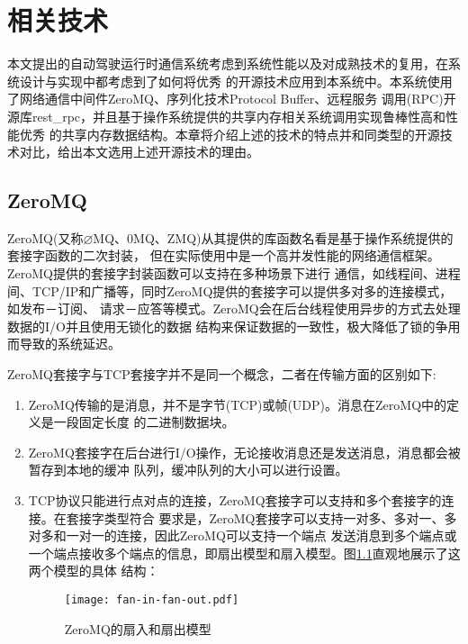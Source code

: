 \chapter{相关技术}
本文提出的自动驾驶运行时通信系统考虑到系统性能以及对成熟技术的复用，在系统设计与实现中都考虑到了如何将优秀
的开源技术应用到本系统中。本系统使用了网络通信中间件ZeroMQ、序列化技术Protocol Buffer、远程服务
调用(RPC)开源库rest\_rpc，并且基于操作系统提供的共享内存相关系统调用实现鲁棒性高和性能优秀
的共享内存数据结构。本章将介绍上述的技术的特点并和同类型的开源技术对比，给出本文选用上述开源技术的理由。
\section{ZeroMQ}
ZeroMQ(又称$\varnothing$MQ、0MQ、ZMQ)从其提供的库函数名看是基于操作系统提供的套接字函数的二次封装\cite{wangpeng}，
但在实际使用中是一个高并发性能的网络通信框架。ZeroMQ提供的套接字封装函数可以支持在多种场景下进行
通信，如线程间、进程间、TCP/IP和广播等，同时ZeroMQ提供的套接字可以提供多对多的连接模式，如发布－订阅、
请求－应答等模式\cite{pfp}。ZeroMQ会在后台线程使用异步的方式去处理数据的I/O并且使用无锁化的数据
结构来保证数据的一致性，极大降低了锁的争用而导致的系统延迟\cite{swp}。

ZeroMQ套接字与TCP套接字并不是同一个概念，二者在传输方面的区别如下:
\begin{enumerate}
    \item ZeroMQ传输的是消息，并不是字节(TCP)或帧(UDP)。消息在ZeroMQ中的定义是一段固定长度
    的二进制数据块。
    \item ZeroMQ套接字在后台进行I/O操作，无论接收消息还是发送消息，消息都会被暂存到本地的缓冲
    队列，缓冲队列的大小可以进行设置。
    \item TCP协议只能进行点对点的连接，ZeroMQ套接字可以支持和多个套接字的连接。在套接字类型符合
    要求是，ZeroMQ套接字可以支持一对多、多对一、多对多和一对一的连接，因此ZeroMQ可以支持一个端点
    发送消息到多个端点或一个端点接收多个端点的信息，即扇出模型和扇入模型。图\ref{fan-in-fan-out}直观地展示了这两个模型的具体
    结构：
    \begin{figure}[H]
        \centering
        \texttt{[image: fan-in-fan-out.pdf]}
        \caption{ZeroMQ的扇入和扇出模型}
        \label{fan-in-fan-out}
      \end{figure}
\end{enumerate}

